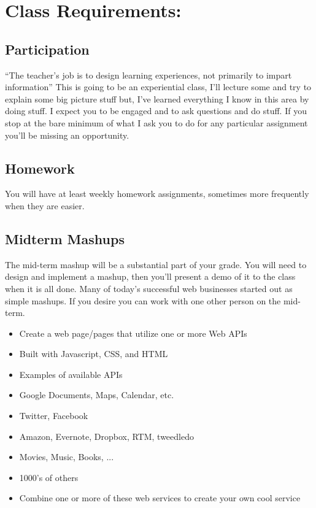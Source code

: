 \documentclass[11pt,twocolumn]{article}
\begin{document}
\section*{Class Requirements:}

\subsection*{Participation}

``The teacher's job is to design learning experiences, not primarily to impart information''  This is going to be an experiential class, I'll lecture some and try to explain some big picture stuff but, I've learned everything I know in this area by doing stuff.  I expect you to be engaged and to ask questions and do stuff.  If you stop at the bare minimum of what I ask you to do for any particular assignment you'll be missing an opportunity.

\subsection*{Homework}

You will have at least weekly homework assignments, sometimes more frequently when they are easier.

\subsection*{Midterm Mashups}

The mid-term mashup will be a substantial part of your grade.  You will need to design and implement a mashup, then you'll present a demo of it to the class when it is all done.  Many of today's successful web businesses started out as simple mashups.  If you desire you can work with one other person on the mid-term.
	\begin{itemize}
	    \item Create a web page/pages that utilize one or more Web APIs
	    \item Built with Javascript, CSS, and HTML
	    \item Examples of available APIs
	    \item Google Documents, Maps, Calendar, etc.
	    \item Twitter, Facebook
	    \item Amazon, Evernote, Dropbox, RTM, tweedledo
	    \item Movies, Music, Books, ...
	    \item 1000's of others
	    \item Combine one or more of these web services to create your own cool service
	\end{itemize}
\end{document}
